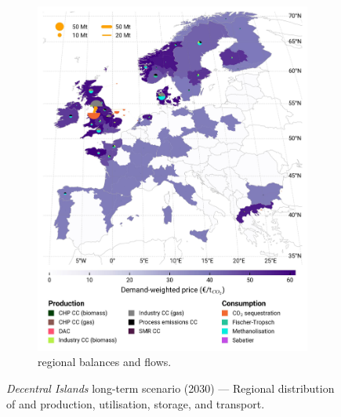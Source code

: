 \documentclass[preprint,12pt,sort&compress]{elsarticle}
\begin{document}
\begin{figure}[htbp]
\begin{subfigure}[t]{0.49\textwidth}
      \includegraphics[width=1\textwidth]{maps/no-pipelines-no-pcipmi/base_s_adm___2030-balance_map_co2_stored} 
      \vspace{-0.7cm}
      \caption{ regional balances and flows.}
      \label{fig:DI_lt_2030_co2}
  \end{subfigure}
  \caption{\textit{Decentral Islands} long-term scenario (2030) --- Regional distribution of  and  production, utilisation, storage, and transport.}
  \label{fig:DI_lt_2030}
\end{figure}
\end{document}
